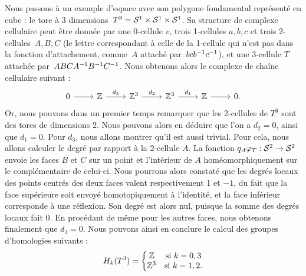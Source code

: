 \begin{exemple}
Nous passons à un exemple d'espace avec son polygone fondamental représenté en cube : le tore à 3 dimensions~${T^3=\mathcal{S}^{1}\times\mathcal{S}^{1}\times\mathcal{S}^{1}}$. Sa structure de complexe cellulaire peut être donnée par une 0-cellule $v$, trois 1-cellules $a,b,c$ et trois 2-cellules~$A,B,C$ (le lettre correspondant à celle de la 1-cellule qui n'est pas dans la fonction d'attachement, comme~$A$ attaché par~$bcb^{-1} c^{-1}$), et une 3-cellule $T$ attachée par~${ABCA^{-1} B^{-1} C^{-1}}$. Nous obtenons alors le complexe de chaîne cellulaire suivant : \[\begin{tikzcd}
0\arrow[r]&\bb{Z}\arrow[r,"d_3"]&\bb{Z}^3\arrow[r,"d_2"]&\bb{Z}^3\arrow[r,"d_1"]&\bb{Z}\arrow[r]&0.
\end{tikzcd}\] Or, nous pouvons dans un premier temps remarquer que les 2-cellules de $T^3$ sont des tores de dimensions 2. Nous pouvons alors en déduire que l'on a $d_2=0$, ainsi que $d_1=0$. Pour $d_3$, nous allons montrer qu'il est aussi trivial. Pour cela, nous allons calculer le degré par rapport à la 2-cellule $A$. La fonction $q_A\varphi_T:\mathcal{S}^{2}\to\mathcal{S}^{2}$ envoie les faces $B$ et $C$ sur un point et l'intérieur de $A$ homéomorphiquement sur le complémentaire de celui-ci. Nous pourrons alors constaté que les degrés locaux des points centrés des deux faces valent respectivement 1 et $-1$, du fait que la face supérieure soit envoyé homotopiquement à l'identité, et la face inférieur corresponde à une réflexion. Son degré est alors nul, puisque la somme des degrés locaux fait 0. En procédant de même pour les autres faces, nous obtenons finalement que $d_3=0$. Nous pouvons ainsi en conclure le calcul des groupes d'homologies suivants : \[H_k(T^3)=\left\{\begin{matrix}
\mathbb{Z}&\text{si }k=0,3\\
\mathbb{Z}^3&\text{si }k=1,2.
\end{matrix}\right.\]
\end{exemple}


